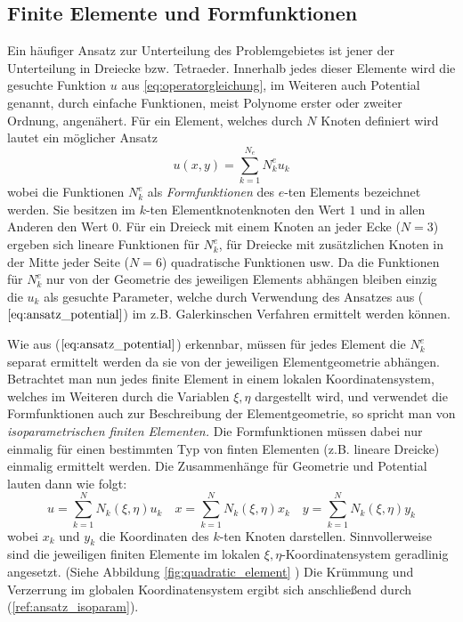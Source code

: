 \subsection{Finite Elemente und Formfunktionen}
\label{sec:finite_elements_and_shape_functions}
Ein häufiger Ansatz zur Unterteilung des Problemgebietes ist jener der Unterteilung in Dreiecke bzw. Tetraeder. Innerhalb jedes dieser Elemente wird die gesuchte Funktion $u$ aus \ref{eq:operatorgleichung}, im Weiteren auch Potential genannt, durch einfache Funktionen, meist Polynome erster oder zweiter Ordnung, angenähert.\newline
Für ein Element, welches durch $N$ Knoten definiert wird lautet ein möglicher Ansatz 
\begin{equation}
\label{eq:ansatz_potential}
u(x,y) = \sum_{k = 1}^{N_e}N_k^e u_k
\end{equation}
wobei die Funktionen $N_k^e$ als \textit{Formfunktionen} des $e$-ten Elements bezeichnet werden. Sie besitzen im $k$-ten Elementknotenknoten den Wert $1$ und in allen Anderen den Wert $0$. \newline
Für ein Dreieck mit einem Knoten an jeder Ecke ($N = 3$) ergeben sich lineare Funktionen für $N_k^e$, für Dreiecke mit zusätzlichen Knoten in der Mitte jeder Seite ($N=6$) quadratische Funktionen usw. \newline
Da die Funktionen für $N_k^e$ nur von der Geometrie des jeweiligen Elements abhängen bleiben einzig die $u_k$ als gesuchte Parameter, welche durch Verwendung des Ansatzes aus ($\ref{eq:ansatz_potential}$) im z.B. Galerkinschen Verfahren ermittelt werden können.\newline

Wie aus ($\ref{eq:ansatz_potential}$) erkennbar, müssen für jedes Element die $N_k^e$ separat ermittelt werden da sie von der jeweiligen Elementgeometrie abhängen. Betrachtet man nun jedes finite Element in einem lokalen Koordinatensystem, welches im Weiteren durch die Variablen $\xi,\eta$ dargestellt wird, und verwendet die Formfunktionen auch zur Beschreibung der Elementgeometrie, so spricht man von \textit{isoparametrischen finiten Elementen.}\newline
Die Formfunktionen müssen dabei nur einmalig für einen bestimmten Typ von finten Elementen (z.B. lineare Dreicke) einmalig ermittelt werden. Die Zusammenhänge für Geometrie und Potential lauten dann wie folgt:
\begin{equation}
\label{ref:ansatz_isoparam}
u = \sum_{k = 1}^{N} N_k(\xi, \eta) u_k \quad x = \sum_{k = 1}^{N} N_k(\xi, \eta) x_k  \quad y = \sum_{k = 1}^{N} N_k(\xi, \eta) y_k \nonumber
\end{equation}
wobei $x_k$ und $y_k$ die Koordinaten des $k$-ten Knoten darstellen. Sinnvollerweise sind die jeweiligen finiten Elemente im lokalen $\xi,\eta$-Koordinatensystem geradlinig angesetzt. (Siehe Abbildung \ref{fig:quadratic_element} ) Die Krümmung und Verzerrung im globalen Koordinatensystem ergibt sich anschließend durch (\ref{ref:ansatz_isoparam}).



